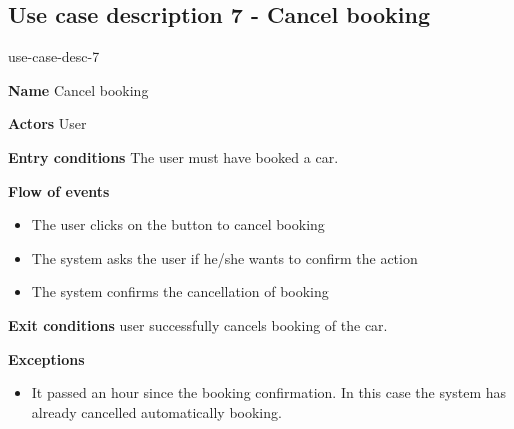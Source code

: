 \subsection{Use case description 7 - Cancel booking}
\begin{labeling}{use-case-desc-7}
		\item[\textbf{Name}] Cancel booking
		\item[\textbf{Actors}] User
		\item[\textbf{Entry conditions}] The user must have booked a car.
		\item[\textbf{Flow of events}]
			\begin{itemize}
				\item[]
				\item The user clicks on the button to cancel booking
				\item The system asks the user if he/she wants to confirm the action
				\item The system confirms the cancellation of booking
			\end{itemize}
		\item[\textbf{Exit conditions}] user successfully cancels booking of the car.
		\item[\textbf{Exceptions}]
			\begin{itemize}
				\item[]
				\item It passed an hour since the booking confirmation. In this case the system has already cancelled automatically booking. 
			\end{itemize}
	\end{labeling}
	
